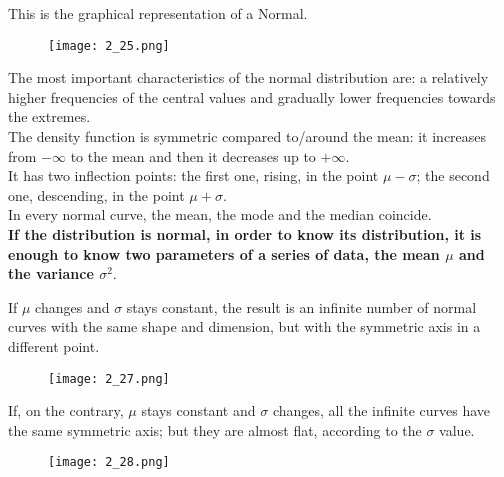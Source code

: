 \begin{frame}
\vspace*{.25cm}
This is the graphical representation of a Normal.\\
\vspace*{.25cm}
\begin{figure}
\texttt{[image: 2\_25.png]}
\end{figure}
\end{frame}

\begin{frame}
  \vspace*{.25cm}
  The most important characteristics of the normal distribution are: a relatively higher frequencies of the central values and gradually lower frequencies towards the extremes. \\
  \vspace*{.25cm}
  The density function is symmetric compared to/around the mean: it increases from $ -\infty $ to the mean and then it decreases up to $ +\infty $. \\
  \vspace*{.25cm}
  It has two inflection points: the first one, rising, in the point $ \mu - \sigma $; the second one, descending, in the point $ \mu + \sigma $. \\
  \vspace*{.25cm}
  In every normal curve, the mean, the mode and the median coincide. \\
  \vspace*{.25cm}
  \textbf{If the distribution is normal, in order to know its distribution, it is enough to know two parameters of a series of data, the mean {\boldmath$ \mu $} and the variance {\boldmath$ \sigma ^2 $}}.
\end{frame}

\begin{frame}
  \vspace*{.25cm}
  If $ \mu $ changes and $ \sigma $ stays constant, the result is an infinite number of normal curves with the same shape and dimension, but with the symmetric axis in a different point.
  \begin{figure}
    \texttt{[image: 2\_27.png]}
  \end{figure}
\end{frame}

\begin{frame}
  \vspace*{.25cm}
  If, on the contrary, $ \mu $ stays constant and $ \sigma $ changes, all the infinite curves have the same symmetric axis; but they are almost flat, according to the $ \sigma $ value.
  \begin{figure}
    \texttt{[image: 2\_28.png]}
  \end{figure}
\end{frame}

